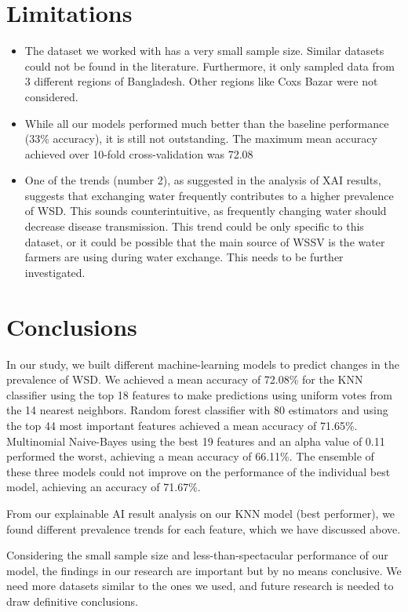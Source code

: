 \documentclass[journal,comsoc]{IEEEtran}
\begin{document}
\section{Limitations}
\begin{itemize}[itemsep=10pt]
    \item The dataset we worked with has a very small sample size. Similar datasets could not be found in the literature. Furthermore, it only sampled data from 3 different regions of Bangladesh. Other regions like Coxs Bazar were not considered.

    \item While all our models performed much better than the baseline performance (33\% accuracy), it is still not outstanding. The maximum mean accuracy achieved over 10-fold cross-validation was 72.08%

    \item One of the trends (number 2), as suggested in the analysis of XAI results, suggests that exchanging water frequently contributes to a higher prevalence of WSD. This sounds counterintuitive, as frequently changing water should decrease disease transmission. This trend could be only specific to this dataset, or it could be possible that the main source of WSSV is the water farmers are using during water exchange. This needs to be further investigated.
\end{itemize}

\section{Conclusions}
In our study, we built different machine-learning models to predict changes in the prevalence of WSD. We achieved a mean accuracy of 72.08\% for the KNN classifier using the top 18 features to make predictions using uniform votes from the 14 nearest neighbors. Random forest classifier with 80 estimators and using the top 44 most important features achieved a mean accuracy of 71.65\%. Multinomial Naive-Bayes using the best 19 features and an alpha value of 0.11 performed the worst, achieving a mean accuracy of 66.11\%. The ensemble of these three models could not improve on the performance of the individual best model, achieving an accuracy of 71.67\%.

From our explainable AI result analysis on our KNN model (best performer), we found different prevalence trends for each feature, which we have discussed above.

Considering the small sample size and less-than-spectacular performance of our model, the findings in our research are important but by no means conclusive. We need more datasets similar to the ones we used, and future research is needed to draw definitive conclusions.
\end{document}
